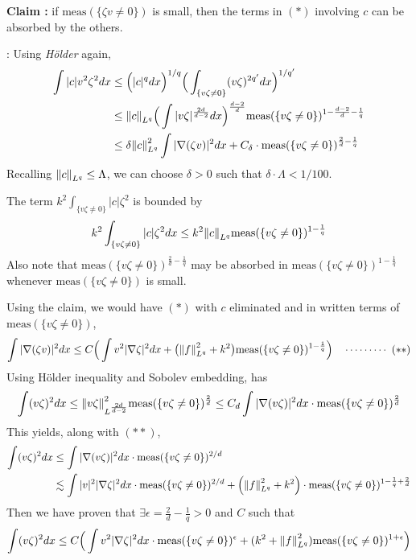 \documentclass[12pt,a4paper]{article}
\newenvironment{proof}
{\begin{changemargin}{0.5cm}{0.5cm} 
	}%
	{\end{changemargin}
}
\newenvironment{subproof}
{\begin{changemargin}{0.5cm}{0.5cm} 
	}%
	{\end{changemargin}
}
\newenvironment{p}
{\begin{proof} 
	}%
	{\end{proof}
}
\begin{document}
\begin{p}
\textbf{Claim :} if $\text{meas}(\{\zeta v\neq 0\})$ is small, then the terms in $(*)$ involving $c$ can be absorbed by the others. 
\begin{subproof}
: Using \emph{H\"older} again,
\begin{align*}
\int |c| v^2 \zeta^2 dx & \leq \Big( |c|^q dx\Big)^{1/q} \Big( \int_{\{v\zeta \neq 0\}} (v\zeta)^{2q'} dx\Big)^{1/q'} \\
& \leq \snorms{c}{L^q} \Big( \int |v\zeta|^{\frac{2d}{d-2}} dx\Big)^{\frac{d-2}{d}} \text{meas}(\{v\zeta \neq 0\})^{1-\frac{d-2}{d} - \frac{1}{q}} \\
& \leq \delta \snorms{c}{L^q}^2 \int |\nabla(\zeta v)|^2 dx + C_{\delta}\cdot \text{meas}(\{v\zeta \neq 0\})^{\frac{2}{d} - \frac{1}{q}}
\end{align*}
Recalling $\snorms{c}{L^q} \leq \Lambda$, we can choose $\delta >0$ such that $\delta \cdot \Lambda < 1/100$.

\quad The term $k^2 \int_{\{v\zeta \neq 0 \}} |c| \zeta^2$ is bounded by
\begin{align*}
k^2 \int_{\{v\zeta \neq 0 \}} |c| \zeta^2 dx \leq k^2 \snorms{c}{L^q} \text{meas}(\{v\zeta \neq 0\})^{1- \frac{1}{q}}
\end{align*}
Also note that $\text{meas}(\{v\zeta \neq 0 \})^{\frac{2}{d} - \frac{1}{q}}$ may be absorbed in $\text{meas}(\{v\zeta \neq 0 \})^{1-\frac{1}{q}}$ whenever $\text{meas}(\{v\zeta \neq 0 \})$ is small.
\end{subproof}
Using the claim, we would have $(*)$ with $c$ eliminated and in written terms of $\text{meas}(\{v\zeta \neq 0\})$, 
\begin{align*}
\int |\nabla (\zeta v)|^2 dx \leq C \Big( \int v^2 |\nabla \zeta|^2 dx + \big( \snorms{f}{L^q}^2 + k^2 \big) \text{meas}(\{v\zeta \neq 0 \})^{1-\frac{1}{q}}\Big) \call{**} 
\end{align*}
Using H\"older inequality and Sobolev embedding, has
\begin{align*}
\int (v\zeta)^2 dx \leq \snorms{v\zeta}{L^{\frac{2d}{d-2}}}^2 \text{meas}(\{v\zeta \neq 0 \})^{\frac{2}{d}} \leq C_d \int |\nabla(v\zeta)|^2 dx \cdot \text{meas}(\{v\zeta \neq 0 \})^{\frac{2}{d}}
\end{align*}
This yields, along with $(**)$,
\begin{align*}
\int (v\zeta)^2 dx &\leq \int |\nabla (v\zeta )|^2 dx \cdot \text{meas}(\{v\zeta \neq 0\})^{2/d} \\
& \lesssim \int |v|^2 |\nabla \zeta|^2 dx \cdot \text{meas}(\{v\zeta \neq 0\})^{2/d} + \Big( \snorms{f}{L^q}^2 +k^2 \Big) \cdot \text{meas}(\{v\zeta \neq 0\})^{1- \frac{1}{q} + \frac{2}{d}}
\end{align*}
Then we have proven that $\exists \epsilon = \frac{2}{d} - \frac{1}{q} >0$ and $C$ such that
\begin{align*}
\int (v\zeta)^2 dx \leq C\Big( \int v^2 |\nabla \zeta|^2 dx \cdot \text{meas}(\{v\zeta \neq 0\})^{\epsilon} + (k^2 + \snorms{f}{L^q}^2) \text{meas}(\{v\zeta \neq 0\})^{1+ \epsilon} \Big)
\end{align*}


\end{p}
\end{document}
